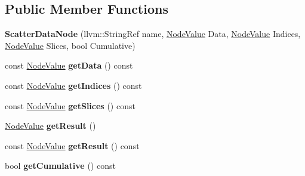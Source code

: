 \subsection*{Public Member Functions}
\begin{DoxyCompactItemize}
\item 
\mbox{\label{classglow_1_1_scatter_data_node_ab2436191e3916bbb2ed9d7b44c001c90}} 
{\bfseries Scatter\+Data\+Node} (llvm\+::\+String\+Ref name, \hyperlink{structglow_1_1_node_value}{Node\+Value} Data, \hyperlink{structglow_1_1_node_value}{Node\+Value} Indices, \hyperlink{structglow_1_1_node_value}{Node\+Value} Slices, bool Cumulative)
\item 
\mbox{\label{classglow_1_1_scatter_data_node_a54c8d95691826c7937680c56904c7eab}} 
const \hyperlink{structglow_1_1_node_value}{Node\+Value} {\bfseries get\+Data} () const
\item 
\mbox{\label{classglow_1_1_scatter_data_node_ac73e2b0ff8d6b106f3df1898ab301018}} 
const \hyperlink{structglow_1_1_node_value}{Node\+Value} {\bfseries get\+Indices} () const
\item 
\mbox{\label{classglow_1_1_scatter_data_node_afdfb72403f773d6400fa53a45a1cbf71}} 
const \hyperlink{structglow_1_1_node_value}{Node\+Value} {\bfseries get\+Slices} () const
\item 
\mbox{\label{classglow_1_1_scatter_data_node_a1eaf4adb64b196dcfed526e52985d63d}} 
\hyperlink{structglow_1_1_node_value}{Node\+Value} {\bfseries get\+Result} ()
\item 
\mbox{\label{classglow_1_1_scatter_data_node_adafdfad6fac3f1daf69e7a17c50332bc}} 
const \hyperlink{structglow_1_1_node_value}{Node\+Value} {\bfseries get\+Result} () const
\item 
\mbox{\label{classglow_1_1_scatter_data_node_a62869b9e642f3dff3e238a07535597a6}} 
bool {\bfseries get\+Cumulative} () const
\item 
\mbox{\label{classglow_1_1_scatter_data_node_ac406444be36c88b495b69e4ab884e582}} 

\end{DoxyCompactItemize}
